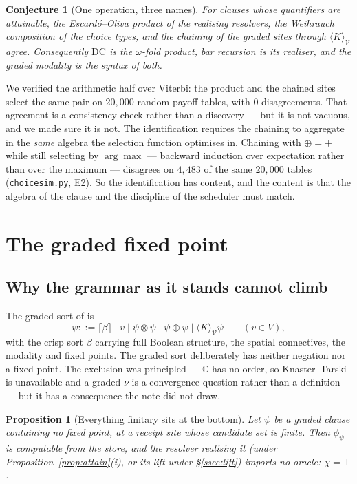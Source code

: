 \documentclass[11pt]{article}
\theoremstyle{definition}
\theoremstyle{plain}
\newtheorem{proposition}{Proposition}
\newtheorem{conjecture}{Conjecture}
\theoremstyle{remark}
\newcommand{\V}{\mathcal{V}}
\newcommand{\sumv}{\oplus}
\newcommand{\tensorv}{\otimes}
\newcommand{\Cx}{\mathbb{C}}
\newcommand{\crisp}[1]{\lceil #1 \rceil}
\newcommand{\DC}{\mathrm{DC}}
\begin{document}
\begin{conjecture}[One operation, three names]\label{conj:one}
For clauses whose quantifiers are attainable, the Escard\'o--Oliva product of the
realising resolvers, the Weihrauch composition of the choice types, and the chaining of
the graded sites through $\langle K \rangle_\V$ agree. Consequently $\DC$ is the
$\omega$-fold product, bar recursion is its realiser, and the graded modality is the
syntax of both.
\end{conjecture}

We verified the arithmetic half over Viterbi: the product and the chained sites select
the same pair on $20{,}000$ random payoff tables, with $0$ disagreements. That
agreement is a consistency check rather than a discovery --- but it is not vacuous, and
we made sure it is not. The identification requires the chaining to aggregate in the
\emph{same} algebra the selection function optimises in. Chaining with $\sumv = +$
while still selecting by $\arg\max$ --- backward induction over expectation rather than
over the maximum --- disagrees on $4{,}483$ of the same $20{,}000$ tables
(\texttt{choicesim.py}, E2). So the identification has content, and the content is that
the algebra of the clause and the discipline of the scheduler must match.

\section{The graded fixed point}\label{sec:fix}

\subsection{Why the grammar as it stands cannot climb}

The graded sort of \cite{gradedwhere} is
\[
  \psi ::= \crisp{\beta} \mid v \mid \psi \tensorv \psi \mid \psi \sumv \psi
  \mid \langle K \rangle_\V \psi \qquad (v \in V),
\]
with the crisp sort $\beta$ carrying full Boolean structure, the spatial connectives,
the modality and fixed points. The graded sort deliberately has neither negation nor a
fixed point. The exclusion was principled --- $\Cx$ has no order, so Knaster--Tarski is
unavailable and a graded $\nu$ is a convergence question rather than a definition ---
but it has a consequence the note did not draw.

\begin{proposition}[Everything finitary sits at the bottom]\label{prop:bottom}
Let $\psi$ be a graded clause containing no fixed point, at a receipt site whose
candidate set is finite. Then $\phi_\psi$ is computable from the store, and the
resolver realising it (under Proposition~\ref{prop:attain}(i), or its lift under
\S\ref{ssec:lift}) imports no oracle: $\chi = \bot$.
\end{proposition}
\end{document}
